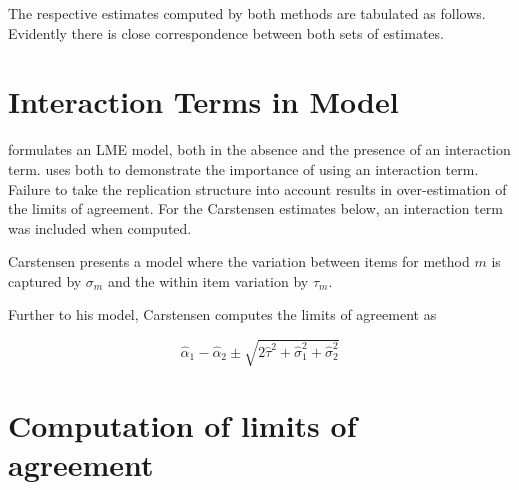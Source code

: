 \documentclass[12pt, a4paper]{report}
\theoremstyle{plain}
\theoremstyle{definition}
\theoremstyle{remark}
\begin{document}
The respective estimates computed by both methods are tabulated as follows. Evidently there is close correspondence between both sets of estimates.


\section{Interaction Terms in Model}
\citet{BXC2008} formulates an LME model, both in the absence and the presence of an interaction term.\citet{bxc} uses both to demonstrate the importance of using an interaction term. Failure to take the replication structure into
account results in over-estimation of the limits of agreement. For the Carstensen estimates below, an interaction term was included when computed.



Carstensen presents a model where the variation between items for
method $m$ is captured by $\sigma_m$ and the within item variation
by $\tau_m$.

Further to his model, Carstensen computes the limits of agreement
as

\[
\hat{\alpha}_1 - \hat{\alpha}_2 \pm \sqrt{2 \hat{\tau}^2 +
	\hat{\sigma}^2_1 + \hat{\sigma}^2_2}
\]
	\section{Computation of limits of agreement }
	
	
	
\end{document}

